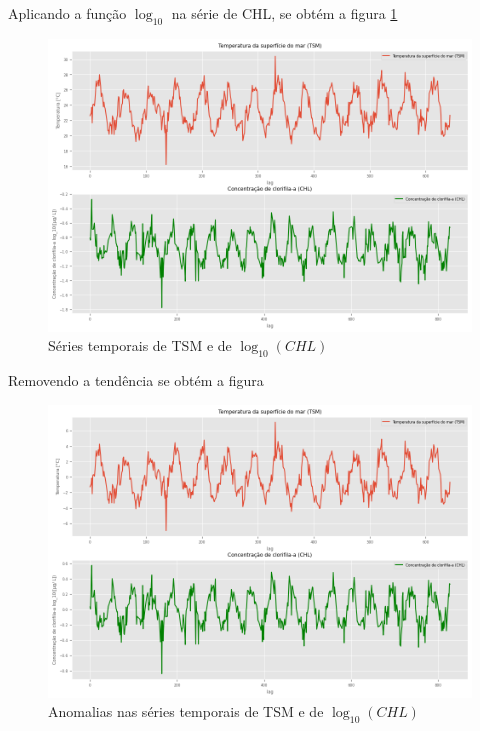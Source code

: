 \documentclass[12pt,a4paper,portuguese]{article}
\begin{document}
Aplicando a função $\log_{10}$ na série de CHL, se obtém a figura \ref{fig:lista4-2d}
\begin{figure}[H]
	\centering
	\includegraphics[width=1\linewidth]{lista4-2d}
	\caption{Séries temporais de TSM e de $\log_{10}(CHL)$}
	\label{fig:lista4-2d}
\end{figure}

Removendo a tendência se obtém a figura

\begin{figure}[H]
	\centering
	\includegraphics[width=1\linewidth]{lista4-2e}
	\caption{Anomalias nas séries temporais de TSM e de $\log_{10}(CHL)$}
	\label{fig:lista4-2e}
\end{figure}
\end{document}
